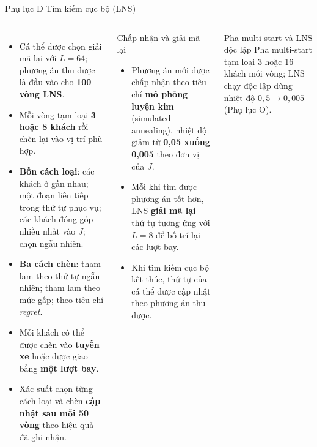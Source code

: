 \documentclass[aspectratio=169,10pt,t,xcolor={table}]{beamer}
\newcommand{\apptitle}[2]{Phụ lục #1 \textperiodcentered{} #2}
\begin{document}
\begin{frame}{\apptitle{D}{Tìm kiếm cục bộ (LNS)}}
\begin{columns}[T,onlytextwidth]
\begin{itemize}\scriptsize
\item Cá thể được chọn giải mã lại với $L=64$; phương án thu được là đầu vào cho \textbf{100 vòng LNS}.
\item Mỗi vòng tạm loại \textbf{3 hoặc 8 khách} rồi chèn lại vào vị trí phù hợp.
\item \textbf{Bốn cách loại}: các khách ở gần nhau; một đoạn liên tiếp trong thứ tự phục vụ; các khách đóng góp nhiều nhất vào $J$; chọn ngẫu nhiên.
\item \textbf{Ba cách chèn}: tham lam theo thứ tự ngẫu nhiên; tham lam theo mức gấp; theo tiêu chí \emph{regret}.
\item Mỗi khách có thể được chèn vào \textbf{tuyến xe} hoặc được giao bằng \textbf{một lượt bay}.
\item Xác suất chọn từng cách loại và chèn \textbf{cập nhật sau mỗi 50 vòng} theo hiệu quả đã ghi nhận.
\end{itemize}
\begin{block}{Chấp nhận và giải mã lại}
\scriptsize
\begin{itemize}
\item Phương án mới được chấp nhận theo tiêu chí \textbf{mô phỏng luyện kim} (simulated annealing), nhiệt độ giảm từ \textbf{0,05 xuống 0,005} theo đơn vị của $J$.
\item Mỗi khi tìm được phương án tốt hơn, LNS \textbf{giải mã lại} thứ tự tương ứng với $L=8$ để bố trí lại các lượt bay.
\item Khi tìm kiếm cục bộ kết thúc, thứ tự của cá thể được cập nhật theo phương án thu được.
\end{itemize}
\end{block}
\begin{exampleblock}{Pha multi-start và LNS độc lập}
\scriptsize Pha multi-start tạm loại 3 hoặc 16 khách mỗi vòng; LNS chạy độc lập dùng nhiệt độ $0{,}5\to0{,}005$ (Phụ lục O).
\end{exampleblock}
\end{columns}
\end{frame}
\end{document}
